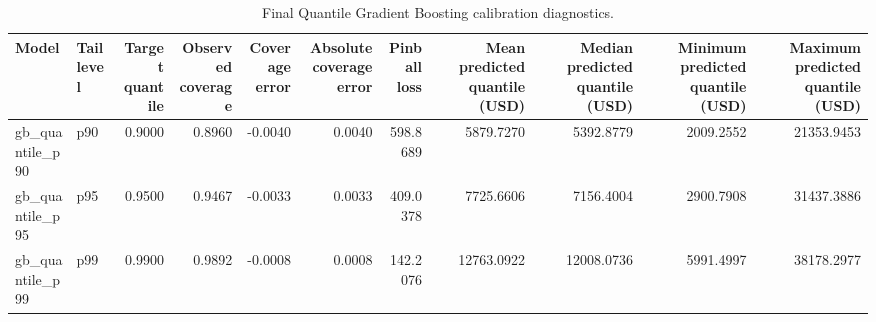 \begin{table}
\caption{Final Quantile Gradient Boosting calibration diagnostics.}
\label{tab:09-final-quantile-model-diagnostics}
\begin{tabular}{llrrrrrrrrr}
\toprule
Model & Tail level & Target quantile & Observed coverage & Coverage error & Absolute coverage error & Pinball loss & Mean predicted quantile (USD) & Median predicted quantile (USD) & Minimum predicted quantile (USD) & Maximum predicted quantile (USD) \\
\midrule
gb_quantile_p90 & p90 & 0.9000 & 0.8960 & -0.0040 & 0.0040 & 598.8689 & 5879.7270 & 5392.8779 & 2009.2552 & 21353.9453 \\
gb_quantile_p95 & p95 & 0.9500 & 0.9467 & -0.0033 & 0.0033 & 409.0378 & 7725.6606 & 7156.4004 & 2900.7908 & 31437.3886 \\
gb_quantile_p99 & p99 & 0.9900 & 0.9892 & -0.0008 & 0.0008 & 142.2076 & 12763.0922 & 12008.0736 & 5991.4997 & 38178.2977 \\
\bottomrule
\end{tabular}
\end{table}
